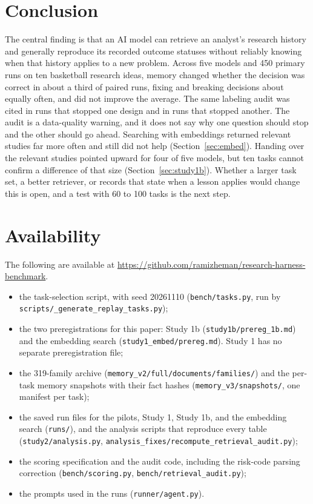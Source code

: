 \documentclass[11pt]{article}
\begin{document}
\section{Conclusion}
\label{sec:conclusion}

The central finding is that an AI model can retrieve an analyst's research history and generally reproduce its recorded outcome statuses without reliably knowing when that history applies to a new problem. Across five models and 450 primary runs on ten basketball research ideas, memory changed whether the decision was correct in about a third of paired runs, fixing and breaking decisions about equally often, and did not improve the average. The same labeling audit was cited in runs that stopped one design and in runs that stopped another. The audit is a data-quality warning, and it does not say why one question should stop and the other should go ahead. Searching with embeddings returned relevant studies far more often and still did not help (Section~\ref{sec:embed}). Handing over the relevant studies pointed upward for four of five models, but ten tasks cannot confirm a difference of that size (Section~\ref{sec:study1b}). Whether a larger task set, a better retriever, or records that state when a lesson applies would change this is open, and a test with 60 to 100 tasks is the next step.

\section*{Availability}
\label{sec:availability}

The following are available at \url{https://github.com/ramizheman/research-harness-benchmark}.

\begin{itemize}\raggedright
\item the task-selection script, with seed 20261110 (\texttt{bench/\allowbreak tasks.py}, run by \texttt{scripts/\_generate\_replay\_tasks.py});
\item the two preregistrations for this paper: Study 1b (\texttt{study1b/\allowbreak prereg\_1b.md}) and the embedding search (\texttt{study1\_embed/\allowbreak prereg.md}). Study 1 has no separate preregistration file;
\item the 319-family archive (\texttt{memory\_v2/\allowbreak full/\allowbreak documents/\allowbreak families/}) and the per-task memory snapshots with their fact hashes (\texttt{memory\_v3/\allowbreak snapshots/}, one manifest per task);
\item the saved run files for the pilots, Study 1, Study 1b, and the embedding search (\texttt{runs/}), and the analysis scripts that reproduce every table (\texttt{study2/\allowbreak analysis.py}, \texttt{analysis\_fixes/\allowbreak recompute\_retrieval\_audit.py});
\item the scoring specification and the audit code, including the risk-code parsing correction (\texttt{bench/\allowbreak scoring.py}, \texttt{bench/\allowbreak retrieval\_audit.py});
\item the prompts used in the runs (\texttt{runner/\allowbreak agent.py}).
\end{itemize}
\end{document}
